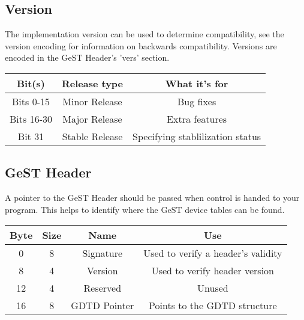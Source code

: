 \documentclass{article}
\begin{document}
\subsection{Version}
The implementation version can be used to determine compatibility, see the version encoding for information on backwards compatibility.
Versions are encoded in the GeST Header's 'vers' section. \\
\begin{center}
\begin{tabular}{ |c|c|c| } 
    \hline
    Bit(s) & Release type & What it's for \\
    \hline
    Bits 0-15 & Minor Release & Bug fixes \\ 
    \hline
    Bits 16-30 & Major Release & Extra features \\ 
    \hline
    Bit 31 & Stable Release & Specifying stablilization status \\ 
    \hline
\end{tabular}
\end{center}

\subsection{GeST Header}
A pointer to the GeST Header should be passed when control is handed to your program. This helps to identify where the GeST device tables can be found.
\\
\begin{center}
\begin{tabular}{ |c|c|c|c| }
    \hline
    Byte & Size & Name & Use \\
    \hline
    0 & 8 & Signature & Used to verify a header's validity \\
    \hline
    8 & 4 & Version & Used to verify header version \\
    \hline
    12 & 4 & Reserved & Unused \\
    \hline
    16 & 8 & GDTD Pointer & Points to the GDTD structure \\
    \hline
\end{tabular}
\end{center}
\end{document}
